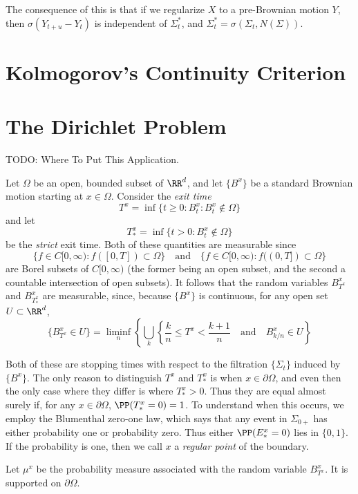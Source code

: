 The consequence of this is that if we regularize $X$ to a \cadlag pre-Brownian motion $Y$, then $\sigma(Y_{t+u} - Y_t)$ is independent of $\Sigma^*_t$, and $\Sigma^*_t = \sigma(\Sigma_t, N(\Sigma))$.

\section{Kolmogorov's Continuity Criterion}




\section{The Dirichlet Problem}

TODO: Where To Put This Application.

Let $\Omega$ be an open, bounded subset of $\RR^d$, and let $\{ B^x \}$ be a standard Brownian motion starting at $x \in \Omega$. Consider the \emph{exit time}
%
\[ T^x = \inf \{ t \geq 0: B^x_t : B^x_t \not \in \Omega \} \]
%
and let
%
\[ T^x_* = \inf \{ t > 0 : B^x_t \not \in \Omega \} \]
%
be the \emph{strict} exit time. Both of these quantities are measurable since
%
\[ \{ f \in C[0,\infty) : f([0,T]) \subset \Omega \} \quad\text{and}\quad \{ f \in C[0,\infty) : f((0,T]) \subset \Omega \} \]
%
are Borel subsets of $C[0,\infty)$ (the former being an open subset, and the second a countable intersection of open subsets). It follows that the random variables $B^x_{T^x}$ and $B^x_{T^x_*}$ are measurable, since, because $\{ B^x \}$ is continuous, for any open set $U \subset \RR^d$,
%
\[ \{ B^x_{T^x} \in U \} = \liminf_n \left\{ \bigcup_k \left\{ \frac{k}{n} \leq T^x < \frac{k+1}{n} \quad\text{and}\quad B^x_{k/n} \in U \right\} \]


Both of these are stopping times with respect to the filtration $\{ \Sigma_t \}$ induced by $\{ B^x \}$. The only reason to distinguish $T^x$ and $T^x_*$ is when $x \in \partial \Omega$, and even then the only case where they differ is where $T^x_* > 0$. Thus they are equal almost surely if, for any $x \in \partial \Omega$, $\PP(T^x_* = 0) = 1$. To understand when this occurs, we employ the Blumenthal zero-one law, which says that any event in $\Sigma_{0+}$ has either probability one or probability zero. Thus either $\PP(E^x_* = 0)$ lies in $\{ 0, 1 \}$. If the probability is one, then we call $x$ a \emph{regular point} of the boundary.

Let $\mu^x$ be the probability measure associated with the random variable $B^x_{T^x}$. It is supported on $\partial \Omega$.

